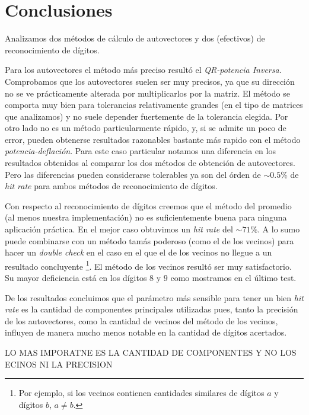 \section{Conclusiones}

	\PARstart Analizamos dos m\'etodos de c\'alculo de autovectores y dos (efectivos)
	de reconocimiento de d\'igitos.

	Para los autovectores el m\'etodo m\'as preciso result\'o el
	\textit{QR-potencia Inversa}. Comprobamos que los autovectores suelen
	ser muy precisos, ya que su direcci\'on no se ve pr\'acticamente alterada
	por multiplicarlos por la matriz. El m\'etodo se comporta muy bien para
	tolerancias relativamente grandes (en el tipo de matrices que analizamos)
	y no suele depender fuertemente de la tolerancia elegida. Por otro lado
	no es un m\'etodo particularmente r\'apido, y, si se admite un poco de
	error, pueden obtenerse resultados razonables bastante m\'as rapido
	con el m\'etodo \textit{potencia-deflaci\'on}. Para este caso particular
	notamos una diferencia en los resultados obtenidos al comparar los
	dos m\'etodos de obtenci\'on de autovectores. Pero las diferencias
	pueden considerarse tolerables ya son del \'orden de $\sim 0.5\%$ de \textit{hit rate} para
	ambos m\'etodos de reconocimiento de d\'igitos.

	Con respecto al reconocimiento de d\'igitos creemos que el m\'etodo del
	promedio (al menos nuestra implementaci\'on) no es suficientemente buena
	para ninguna aplicaci\'on pr\'actica. En el mejor caso obtuvimos un
	\textit{hit rate} del $\sim 71\%$. A lo sumo puede combinarse con un m\'etodo
	tam\'as poderoso (como el de los vecinos) para hacer un \textit{double check}
	en el caso en el que el de los vecinos no llegue a un resultado concluyente
	\footnote{Por ejemplo, si los vecinos contienen cantidades similares
	de d\'igitos $a$ y d\'igitos $b$, $a\neq b$.}.
	El m\'etodo de los vecinos result\'o ser muy satisfactorio. Su mayor
	deficiencia est\'a en los d\'igitos $8$ y $9$ como mostramos en el \'ultimo
	test.


	De los resultados concluimos que el par\'ametro m\'as sensible
	para tener un bien \textit{hit rate} es la cantidad de componentes principales utilizadas
	pues, tanto la precisi\'on de los autovectores, como la cantidad de vecinos
	del m\'etodo de los vecinos, influyen de manera mucho menos notable
	en la cantidad de d\'igitos acertados.

	LO MAS IMPORATNE ES LA CANTIDAD DE COMPONENTES Y NO LOS ECINOS NI LA PRECISION
